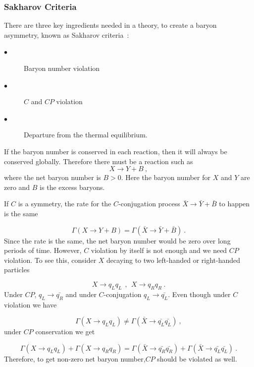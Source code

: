 \subsubsection{Sakharov Criteria}
There are three key ingredients needed in a theory, to create a baryon
asymmetry, known as Sakharov criteria~\cite{Sakharov:1967dj}:
\begin{center}
\begin{description}
\item[$\bullet$]Baryon number violation
\item[$\bullet$] $C$ and $CP$ violation
\item[$\bullet$] Departure from the thermal equilibrium.
\end{description}
\end{center}

If the baryon number is conserved in each reaction, then it will
always be conserved globally. Therefore there must be a reaction such as
\begin{equation}
X \rightarrow Y + B~,
\end{equation}
where the net baryon number is $B > 0$. Here the baryon number for $X$
and $Y$ are zero and $B$ is the excess baryons.

If $C$ is a symmetry, the rate for the $C$-conjugation process
$\bar{X} \rightarrow \bar{Y}+ \bar{B}$ to happen is the same

\begin{equation}
\Gamma(X \rightarrow Y + B) = \Gamma(\bar{X} \rightarrow \bar{Y}+ \bar{B})~.
\end{equation}
Since the rate is the same, the net baryon number would be zero over
long periods of time. However, $C$ violation by itself is not enough
and we need $CP$ violation. To see this, consider $X$ decaying to two
left-handed or right-handed particles

\begin{equation}
X \rightarrow q_Lq_L ~~,~~ X\rightarrow q_Rq_R~.
\end{equation}
Under $CP$, $q_L \rightarrow \bar{q_R}$ and under $C$-conjugation
$q_L \rightarrow \bar{q_L}$. Even though under $C$ violation we have

\begin{equation}
\Gamma(X \rightarrow q_Lq_L) \neq \Gamma(\bar{X} \rightarrow \bar{q_L}\bar{q_L})~,
\end{equation}
under $CP$ conservation we get

\begin{equation}
  \Gamma(X \rightarrow q_Lq_L) + \Gamma(X \rightarrow q_Rq_R) = \Gamma(\bar{X} \rightarrow \bar{q_R}\bar{q_R}) + \Gamma(\bar{X} \rightarrow \bar{q_L}\bar{q_L})~.
\end{equation}
Therefore, to get non-zero net baryon number,$CP$ should be violated
as well.

